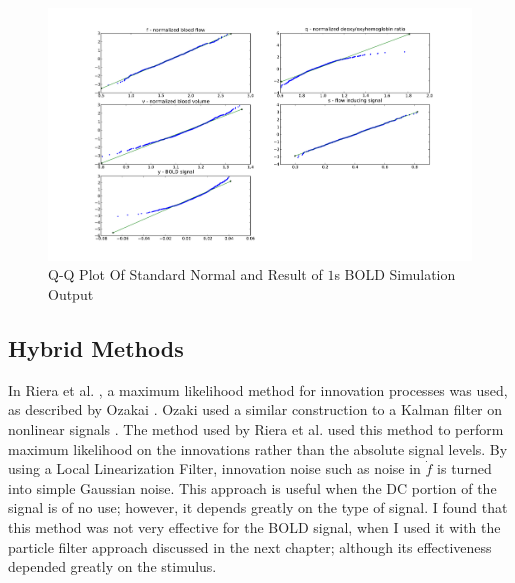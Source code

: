 \begin{figure}
\includegraphics[trim=6cm .75cm 6cm .75cm,width=16cm]{images/gauss_step_1sec_3sigma.pdf}
\caption{Q-Q Plot Of Standard Normal and Result of $1$s BOLD Simulation Output}
\label{fig:trans1s}
\end{figure}

\subsection{Hybrid Methods}
In Riera et al. \cite{Riera2003}, a maximum
likelihood method for innovation processes was used, as described by
Ozakai \cite{Ozaki1994}. Ozaki \cite{Ozaki1994} used a similar construction to a 
Kalman filter on nonlinear signals \cite{Ozaki1994}. 
The method used by Riera et al.\cite{Riera2003} used this method to 
perform maximum likelihood on
the innovations rather than the absolute signal levels. 
By using a Local Linearization Filter,
innovation noise such as noise in $\dot{f}$ is turned into simple 
Gaussian noise. This approach is useful when the \ac{DC} portion of the signal is
of no use; however, it depends greatly on the type of signal. I found that
this method was not very effective for the \ac{BOLD} signal, when I used it 
with the particle filter approach discussed in the next chapter; although its
effectiveness depended greatly on the stimulus.

